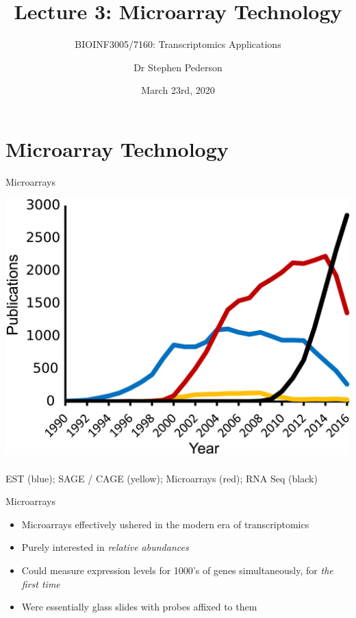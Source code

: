 \documentclass[aspectratio=169,11pt]{beamer}
\author{Dr Stephen Pederson}
\title{Lecture 3: Microarray Technology}
\subtitle{BIOINF3005/7160: Transcriptomics Applications}
\institute{Bioinformatics Hub, \\The University of Adelaide}
\date{March 23rd, 2020}
\begin{document}
\begin{frame}
\titlepage
\end{frame}

\begin{frame}
\footnotesize
\tableofcontents
\end{frame}



\section{Microarray Technology}

\begin{frame}{Microarrays}

	\begin{center}
	\includegraphics[scale=0.5]{figures/timeTrends.png}		
	~\\
	\textcolor[rgb]{0.1,0.4,0.7}{EST (blue)};
	\textcolor[rgb]{0.85,0.65,0.15}{SAGE / CAGE (yellow)};
	\textcolor[rgb]{0.7,0,0.2}{Microarrays (red)};  
	RNA Seq (black) 
	\end{center}

\end{frame}

\begin{frame}{Microarrays}

	\begin{itemize}
		\item Microarrays effectively ushered in the modern era of transcriptomics
		\item Purely interested in \textit{relative abundances}
		\item Could measure expression levels for 1000’s of genes simultaneously, for \textit{the first time}		
		\item Were essentially glass slides with probes affixed to them
	\end{itemize}

\end{frame}
\end{document}
